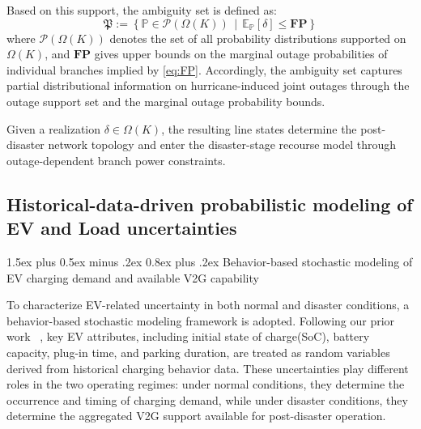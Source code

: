 \documentclass[journal]{IEEEtran}
\makeatletter
\renewcommand\subsubsection{\@startsection{subsubsection}{3}{\z@}%
  {1.5ex plus 0.5ex minus .2ex}%
  {0.8ex plus .2ex}%
  {\normalfont\normalsize\bfseries}}
\providecommand{\1}{\mathbf{1}}
\makeatother
\begin{document}
Based on this support, the ambiguity set is defined as:
\begin{equation}
\mathfrak{P}
:=
\left\{
\mathbb{P} \in \mathcal{P}\!\left(\Omega(K)\right)
\,\middle|\,
\mathbb{E}_{\mathbb{P}}\!\left[{\delta}\right]
\le
\mathbf{FP}
\right\}
\label{eq:DR_ambiguity_set1}
\end{equation}
where $\mathcal{P}(\Omega(K))$ denotes the set of all probability distributions supported on $\Omega(K)$, and $\mathbf{FP}$ gives upper bounds on the marginal outage probabilities of individual branches implied by \eqref{eq:FP}. Accordingly, the ambiguity set captures partial distributional information on hurricane-induced joint outages through the outage support set and the marginal outage probability bounds.

Given a realization 
$\delta \in \Omega(K)$, the resulting line states determine the post-disaster network topology and enter the disaster-stage recourse model through outage-dependent branch power constraints.
\subsection{Historical-data-driven probabilistic modeling of EV and Load uncertainties}

\subsubsection{Behavior-based stochastic modeling of EV charging demand and available V2G capability}

To characterize EV-related uncertainty in both normal and disaster conditions, a behavior-based stochastic modeling framework is adopted. Following our prior work ~\cite{jin2020optimal}, key EV attributes, including initial state of charge(SoC), battery capacity, plug-in time, and parking duration, are treated as random variables derived from historical charging behavior data. These uncertainties play different roles in the two operating regimes: under normal conditions, they determine the occurrence and timing of charging demand, while under disaster conditions, they determine the aggregated V2G support available for post-disaster operation.
\end{document}
